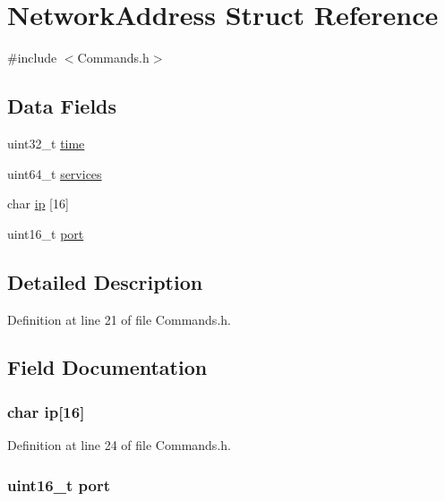 \hypertarget{struct_network_address}{
\section{NetworkAddress Struct Reference}
\label{struct_network_address}
}


{\ttfamily \#include $<$Commands.h$>$}

\subsection*{Data Fields}
\begin{DoxyCompactItemize}
\item 
uint32\_\-t \hyperlink{struct_network_address_ae73654f333e4363463ad8c594eca1905}{time}
\item 
uint64\_\-t \hyperlink{struct_network_address_a8361260b2ca75771b8da0333191db456}{services}
\item 
char \hyperlink{struct_network_address_ac03ec605186c0c6d17c4beaab73d615c}{ip} \mbox{[}16\mbox{]}
\item 
uint16\_\-t \hyperlink{struct_network_address_a8e0798404bf2cf5dabb84c5ba9a4f236}{port}
\end{DoxyCompactItemize}


\subsection{Detailed Description}


Definition at line 21 of file Commands.h.



\subsection{Field Documentation}
\hypertarget{struct_network_address_ac03ec605186c0c6d17c4beaab73d615c}{
\subsubsection[{ip}]{\setlength{\rightskip}{0pt plus 5cm}char {\bf ip}\mbox{[}16\mbox{]}}}
\label{struct_network_address_ac03ec605186c0c6d17c4beaab73d615c}


Definition at line 24 of file Commands.h.

\hypertarget{struct_network_address_a8e0798404bf2cf5dabb84c5ba9a4f236}{
\subsubsection[{port}]{\setlength{\rightskip}{0pt plus 5cm}uint16\_\-t {\bf port}}}
\label{struct_network_address_a8e0798404bf2cf5dabb84c5ba9a4f236}


